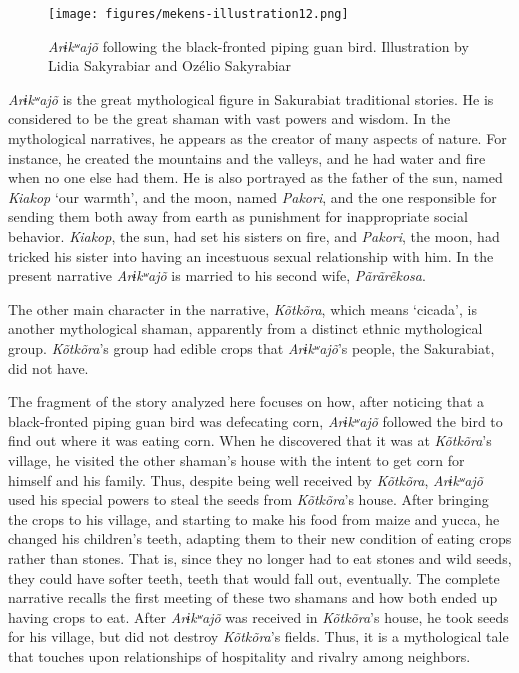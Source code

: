 \documentclass[output=paper,
modfonts,nonflat
]{langsci/langscibook}
\begin{document}
\begin{figure}
\texttt{[image: figures/mekens-illustration12.png]}
  \caption{\textit{Arɨkʷajõ} following the black-fronted piping guan bird. Illustration by Lidia Sakyrabiar and Ozélio Sakyrabiar}
\end{figure}

\textit{Arɨkʷajõ} is the great mythological figure in Sakurabiat traditional stories. He is considered to be the great shaman with vast powers and wisdom. In the mythological narratives, he appears as the creator of many aspects of nature. For instance, he created the mountains and the valleys, and he had water and fire when no one else had them. He is also portrayed as the father of the sun, named \textit{Kiakop} ‘our warmth', and the moon, named \textit{Pakori}, and the one responsible for sending them both away from earth as punishment for inappropriate social behavior. \textit{Kiakop}, the sun, had set his sisters on fire, and \textit{Pakori}, the moon, had tricked his sister into having an incestuous sexual relationship with him. In the present narrative \textit{Arɨkʷajõ} is married to his second wife, \textit{Pãrãrẽkosa}. 

\newpage 
The other main character in the narrative, \textit{Kõtkõra}, which means ‘cicada’, is another mythological shaman, apparently from a distinct ethnic mythological group.  \textit{Kõtkõra}'s group had edible crops that \textit{Arɨkʷajõ}'s people, the Sakurabiat, did not have. 

The fragment of the story analyzed here focuses on how, after noticing that a black-fronted piping guan bird was defecating corn, \textit{Arɨkʷajõ} followed the bird to find out where it was eating corn. When he discovered that it was at \textit{Kõtkõra}'s village, he visited the other shaman's house with the intent to get corn for himself and his family. Thus, despite being well received by \textit{Kõtkõra}, \textit{Arɨkʷajõ} used his special powers to steal the seeds from \textit{Kõtkõra}'s house. After bringing the crops to his village, and starting to make his food from maize and yucca, he changed his children's teeth, adapting them to their new condition of eating crops rather than stones. 
That is, since they no longer had to eat stones and wild seeds, they could have softer teeth, teeth that would fall out, eventually. 
The complete narrative recalls the first meeting of these two shamans and how both ended up having crops to eat. 
After \textit{Arɨkʷajõ} was received in \textit{Kõtkõra}'s house, he took seeds for his village, but did not destroy \textit{Kõtkõra}'s fields. Thus, it is a mythological tale that touches upon relationships of hospitality and rivalry among neighbors. 
\end{document}
